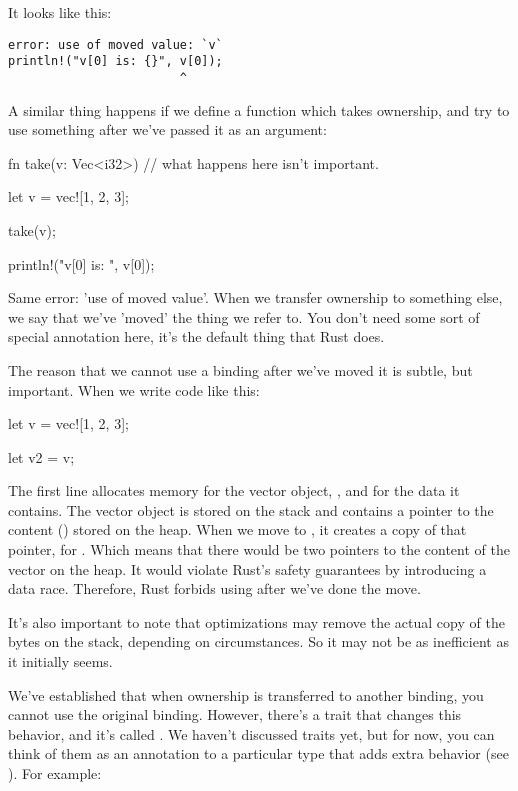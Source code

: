It looks like this:

\begin{verbatim}
error: use of moved value: `v`
println!("v[0] is: {}", v[0]);
                        ^
\end{verbatim}

A similar thing happens if we define a function which takes ownership, and try to use something after we've passed it as an 
argument:

\begin{rustc}
fn take(v: Vec<i32>) {
    // what happens here isn't important.
}

let v = vec![1, 2, 3];

take(v);

println!("v[0] is: {}", v[0]);
\end{rustc}

Same error: 'use of moved value'. When we transfer ownership to something else, we say that we've 'moved' the thing we refer to. 
You don't need some sort of special annotation here, it's the default thing that Rust does.


The reason that we cannot use a binding after we've moved it is subtle, but important. When we write code like this:

\begin{rustc}
let v = vec![1, 2, 3];

let v2 = v;
\end{rustc}

The first line allocates memory for the vector object, , and for the data it contains. The vector object is stored on the 
stack and contains a pointer to the content (\code{[1, 2, 3]}) stored on the heap. When we move  to , it creates 
a copy of that pointer, for . Which means that there would be two pointers to the content of the vector on the heap. It 
would violate Rust's safety guarantees by introducing a data race. Therefore, Rust forbids using  after we've done the move.

\blank

It's also important to note that optimizations may remove the actual copy of the bytes on the stack, depending on circumstances. 
So it may not be as inefficient as it initially seems.


We've established that when ownership is transferred to another binding, you cannot use the original binding. However, there's a 
trait that changes this behavior, and it's called . We haven't discussed traits yet, but for now, you can think of them 
as an annotation to a particular type that adds extra behavior (see ). For example:

